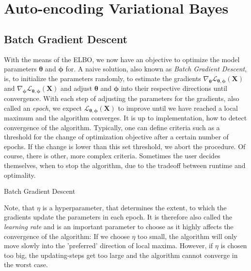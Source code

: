 \documentclass[12pt]{report}
\theoremstyle{definition}
\begin{document}
\section{Auto-encoding Variational Bayes}
\subsection{Batch Gradient Descent}
With the means of the ELBO, we now have an objective to optimize the model parameters $\pmb{\theta}$ and $\pmb{\phi}$ for. A naive solution, also known as \emph{Batch Gradient Descent}, is, to initialize the parameters randomly, to estimate the gradients $\nabla_{\pmb{\theta}}\mathcal{L}_{\pmb{\theta}, \pmb{\phi}}(\mathbf{X})$ and $\nabla_{\pmb{\pmb{\phi}}}\mathcal{L}_{\pmb{\theta}, \pmb{\phi}}(\mathbf{X})$ and adjust $\pmb{\theta}$ and $\pmb{\phi}$ into their respective directions until convergence. With each step of adjusting the parameters for the gradients, also called an \emph{epoch}, we expect $\mathcal{L}_{\pmb{\theta}, \pmb{\phi}}(\mathbf{X})$ to improve until we have reached a local maximum and the algorithm converges. It is up to implementation, how to detect convergence of the algorithm. Typically, one can define criteria such as a threshold for the change of optimization objective after a certain number of epochs. If the change is lower than this set threshold, we abort the procedure. Of course, there is other, more complex criteria. Sometimes the user decides themselves, when to stop the algorithm, due to the tradeoff between runtime and optimality.

\begin{algorithm}[H]
\SetAlgoLined
{}
\caption{Batch Gradient Descent}
\end{algorithm}
Note, that $\eta$ is a hyperparameter, that determines the extent, to which the gradients update the parameters in each epoch. It is therefore also called the \emph{learning rate} and is an important parameter to choose as it highly affects the convergence of the algorithm: If we choose $\eta$ too small, the algorithm will only move slowly into the 'preferred' direction of local maxima. However, if $\eta$ is chosen too big, the updating-steps get too large and the algorithm cannot converge in the worst case.
\end{document}
